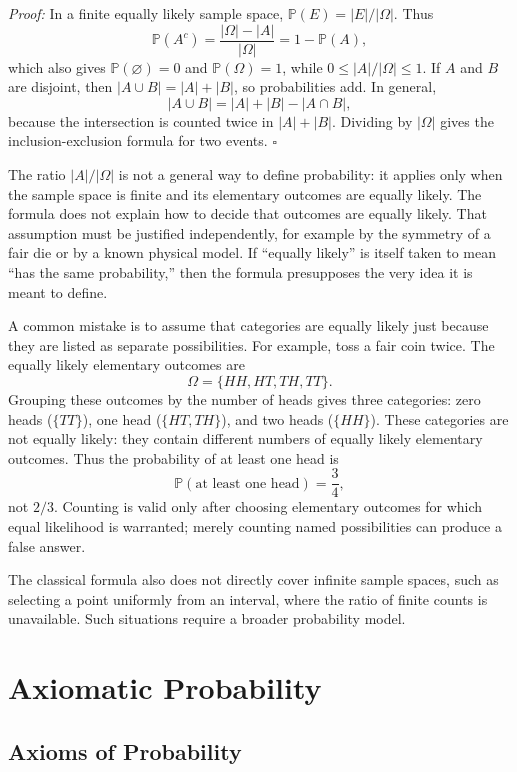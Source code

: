 \documentclass[a4paper,11pt,abstracton]{scrartcl}
\theoremstyle{dotlessP}
\theoremstyle{dotlessS}
\theoremstyle{remark}
\theoremstyle{definition}
\begin{document}
\begin{claim_box}
\textit{Proof:} In a finite equally likely sample space, $\mathbb{P}(E)=|E|/|\Omega|$. Thus
\[
  \mathbb{P}(A^c)=\frac{|\Omega|-|A|}{|\Omega|}=1-\mathbb{P}(A),
\]
which also gives $\mathbb{P}(\varnothing)=0$ and $\mathbb{P}(\Omega)=1$, while $0\leq |A|/|\Omega|\leq1$. If $A$ and $B$ are disjoint, then $|A\cup B|=|A|+|B|$, so probabilities add. In general,
\[
  |A\cup B|=|A|+|B|-|A\cap B|,
\]
because the intersection is counted twice in $|A|+|B|$. Dividing by $|\Omega|$ gives the inclusion-exclusion formula for two events.
\hfill$\square$
\end{claim_box}

The ratio $|A|/|\Omega|$ is not a general way to define probability: it applies only when the sample space is finite and its elementary outcomes are equally likely. The formula does not explain how to decide that outcomes are equally likely. That assumption must be justified independently, for example by the symmetry of a fair die or by a known physical model. If ``equally likely'' is itself taken to mean ``has the same probability,'' then the formula presupposes the very idea it is meant to define.

A common mistake is to assume that categories are equally likely just because they are listed as separate possibilities. For example, toss a fair coin twice. The equally likely elementary outcomes are
\[
  \Omega=\{HH,HT,TH,TT\}.
\]
Grouping these outcomes by the number of heads gives three categories: zero heads ($\{TT\}$), one head ($\{HT,TH\}$), and two heads ($\{HH\}$). These categories are not equally likely: they contain different numbers of equally likely elementary outcomes. Thus the probability of at least one head is
\[
  \mathbb{P}(\text{at least one head})=\frac{3}{4},
\]
not $2/3$. Counting is valid only after choosing elementary outcomes for which equal likelihood is warranted; merely counting named possibilities can produce a false answer.

The classical formula also does not directly cover infinite sample spaces, such as selecting a point uniformly from an interval, where the ratio of finite counts is unavailable. Such situations require a broader probability model.

\section{Axiomatic Probability}

\subsection{Axioms of Probability}
\end{document}
